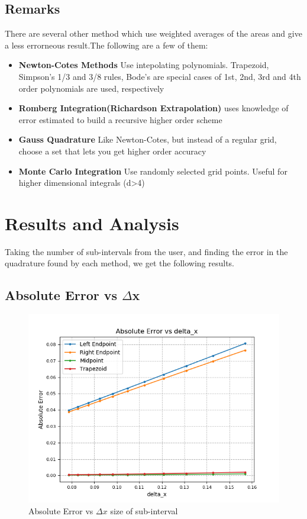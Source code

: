 \documentclass[11pt]{article}
\begin{document}
\subsection{Remarks}
There are several other method which use weighted averages of the areas and give a less errorneous result.The following are a few of them:
\begin{itemize}
	\item \textbf{Newton-Cotes Methods}
	Use intepolating polynomials. Trapezoid, Simpson’s 1/3 and 3/8 rules,
	Bode’s are special cases of 1st, 2nd, 3rd and 4th order polynomials are
	used, respectively
	\item \textbf{Romberg Integration(Richardson Extrapolation)}
	uses knowledge of error estimated to build a recursive higher order scheme
	\item \textbf{Gauss Quadrature}
	Like Newton-Cotes, but instead of a regular grid, choose a set that lets you get higher order accuracy
	\item \textbf{Monte Carlo Integration}
	Use randomly selected grid points. Useful for higher dimensional integrals (d>4)
\end{itemize}

\pagebreak

\section{Results and Analysis}
Taking the number of sub-intervals from the user, and finding the error in the quadrature found by each method, we get the following results.
\subsection{Absolute Error vs $\Delta$x}
\begin{figure}[h!]
	\centering
	\centering
	\includegraphics[width=0.8\linewidth]{abs_error}
	\caption{Absolute Error vs $\Delta x$ size of sub-interval}
	\label{fig4}
\end{figure}
\end{document}
